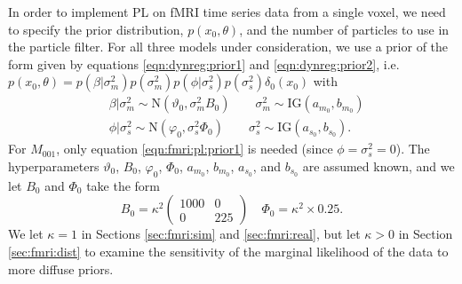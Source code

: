 In order to implement PL on fMRI time series data from a single voxel, we need to specify the prior distribution, $p(x_0,\theta)$, and the number of particles to use in the particle filter. For all three models under consideration, we use a prior of the form given by equations \eqref{eqn:dynreg:prior1} and \eqref{eqn:dynreg:prior2}, i.e. $p(x_0, \theta) = p(\beta|\sigma^2_m)p(\sigma^2_m)p(\phi|\sigma^2_s)p(\sigma^2_s)\delta_0(x_0)$ with
\begin{align}
&\beta|\sigma^2_m \sim \mbox{N}(\vartheta_0, \sigma^2_mB_0) \qquad \sigma^2_m \sim \mbox{IG}(a_{m_0}, b_{m_0}) \label{eqn:fmri:pl:prior1} \\
&\phi|\sigma^2_s \sim \mbox{N}(\varphi_0, \sigma^2_s\Phi_0) \qquad \sigma^2_s \sim \mbox{IG}(a_{s_0}, b_{s_0}). \label{eqn:fmri:pl:prior2}
\end{align}
For $M_{001}$, only equation \eqref{eqn:fmri:pl:prior1} is needed (since $\phi = \sigma^2_s = 0$). The hyperparameters $\vartheta_0$, $B_0$, $\varphi_0$, $\Phi_0$, $a_{m_0}$, $b_{m_0}$, $a_{s_0}$, and $b_{s_0}$ are assumed known, and we let $B_0$ and $\Phi_0$ take the form
\begin{equation}
B_0 = \kappa^2 \left(\begin{array}{cc} 1000 & 0 \\ 0 & 225 \end{array}\right) \quad \Phi_0 = \kappa^2\times0.25. \label{eqn:fmri:kappa}
\end{equation}
We let $\kappa = 1$ in Sections \ref{sec:fmri:sim} and \ref{sec:fmri:real}, but let $\kappa > 0$ in Section \ref{sec:fmri:dist} to examine the sensitivity of the marginal likelihood of the data to more diffuse priors.

